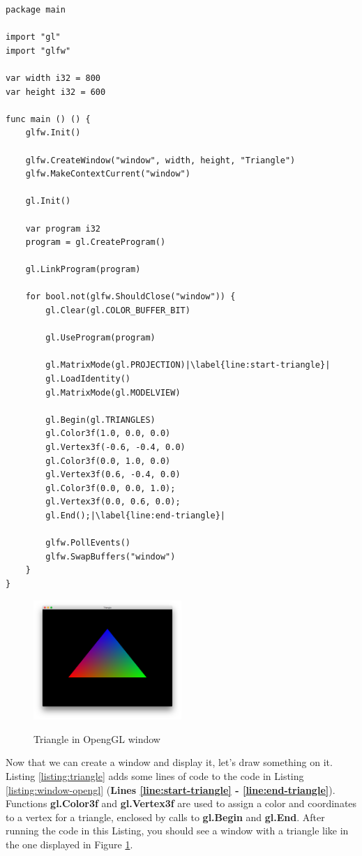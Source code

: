 \documentclass[11pt,fleqn,openany]{book} %
\begin{document}
\begin{lstlisting}[caption={Drawing a Triangle to a Window},captionpos=b,label={listing:triangle}]
package main

import "gl"
import "glfw"

var width i32 = 800
var height i32 = 600

func main () () {
	glfw.Init()

	glfw.CreateWindow("window", width, height, "Triangle")
	glfw.MakeContextCurrent("window")
	
	gl.Init()
	
	var program i32
	program = gl.CreateProgram()
	
	gl.LinkProgram(program)

	for bool.not(glfw.ShouldClose("window")) {
		gl.Clear(gl.COLOR_BUFFER_BIT)

		gl.UseProgram(program)
		
		gl.MatrixMode(gl.PROJECTION)|\label{line:start-triangle}|
		gl.LoadIdentity()
		gl.MatrixMode(gl.MODELVIEW)

		gl.Begin(gl.TRIANGLES)
		gl.Color3f(1.0, 0.0, 0.0)
		gl.Vertex3f(-0.6, -0.4, 0.0)
		gl.Color3f(0.0, 1.0, 0.0)
		gl.Vertex3f(0.6, -0.4, 0.0)
		gl.Color3f(0.0, 0.0, 1.0);
		gl.Vertex3f(0.0, 0.6, 0.0);
		gl.End();|\label{line:end-triangle}|
		
		glfw.PollEvents()
		glfw.SwapBuffers("window")
	}
}
\end{lstlisting}

\begin{figure}
\caption{Triangle in OpengGL window}
\centering
\includegraphics[width=0.5\textwidth]{img/opengl-triangle.png}
\label{figure:triangle}
\end{figure}

Now that we can create a window and display it, let's draw something on it. Listing \ref{listing:triangle} adds some lines of code to the code in Listing \ref{listing:window-opengl} (\textbf{Lines \ref{line:start-triangle} - \ref{line:end-triangle}}). Functions \textbf{gl.Color3f} and \textbf{gl.Vertex3f} are used to assign a color and coordinates to a vertex for a triangle, enclosed by calls to \textbf{gl.Begin} and \textbf{gl.End}. After running the code in this Listing, you should see a window with a triangle like in the one displayed in Figure \ref{figure:triangle}.
\end{document}
